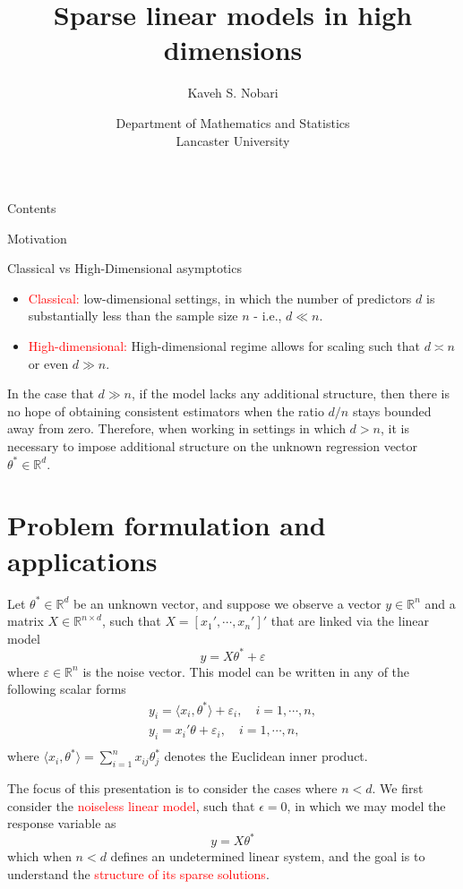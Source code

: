 \documentclass[10pt,handout,english]{beamer}
\title[]{Sparse linear models in high dimensions}
\author[Kaveh S. Nobari]{Kaveh S. Nobari}
\institute[]{Lectures in High-Dimensional Statistics}
\date[27/10/2020]
{Department of Mathematics and Statistics\\ Lancaster University}
\newcommand{\R}{\mathbb{R}}
\begin{document}
\begin{frame}
\titlepage
\end{frame}


\begin{frame}{Contents}
\tableofcontents
\end{frame}

\begin{frame}[allowframebreaks]{Motivation}
\begin{block}{Classical vs High-Dimensional asymptotics}
\begin{itemize}
 \item \textcolor{red}{Classical:} low-dimensional settings, in which the number of predictors  $d$ is substantially less than the sample size $n$ - i.e., $d\ll n$.
\item\textcolor{red}{High-dimensional:} High-dimensional regime allows for scaling such that $d\asymp n$ or even $d\gg n$.
\end{itemize}
\end{block}

In the case that $d\gg n$, if the model lacks any additional structure, then there is no hope of obtaining consistent estimators when the ratio $d/n$ stays bounded away from zero. Therefore, when working in settings in which $d>n$, it is necessary to impose additional structure on the unknown regression vector $\theta^*\in \R^d$.
\end{frame}


\section{Problem formulation and applications}
\frame{\tableofcontents[currentsection]}
\begin{frame}[allowframebreaks]
Let $\theta^*\in \R^d$ be an unknown vector, and suppose we observe a vector $y\in\R^n$ and a matrix $X\in \R^{n\times d}$, such that $X=[x_1',\cdots,x_n']'$ that are linked via the linear model
\[
y=X\theta^*+\varepsilon
\]
where $\varepsilon \in \R^{n}$ is the noise vector. This model can be written in any of the following scalar forms
\begin{align*}
y_i=\langle x_i,\theta^*\rangle+\varepsilon_i,\quad i=1,\cdots,n,\\
y_i=x_i'\theta+\varepsilon_i,\quad i=1,\cdots,n,\\
\end{align*}
where $\langle x_i,\theta^*\rangle=\sum\limits_{i=1}^{n}x_{ij}\theta_j^*$ denotes the Euclidean inner product.

The focus of this presentation is to consider the cases where $n<d$. We first consider the \textcolor{red}{noiseless linear model}, such that $\epsilon=0$, in which we may model the response variable as
\[
y=X\theta^{*}
\]
which when $n<d$ defines an undetermined linear system, and the goal is to understand the \textcolor{red}{structure of its sparse solutions}.
\end{frame}
\end{document}

